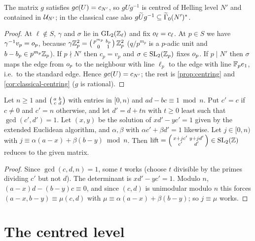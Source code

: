 \begin{proposition}\label{prop:centring-algorithm}
The matrix $g$ satisfies $gc(U) = c_{N'}$, so $gUg^{-1}$ is
centred of Helling level $N'$ and contained in $\mathcal{U}_{N'}$; in the
classical case also $g\lifted{U}g^{-1} \subseteq \GammaZeroStar[lift]{N'}$.
\end{proposition}

\begin{proof}
At $\ell \notin S$, $\gamma$ and $\sigma$ lie in $\GL{2}{\ZZ_\ell}$ and fix
$o_{\ell} = c_\ell$. At $p \in S$ we have
$\gamma^{-1}v_p = o_{p}$, because
$\gamma\mathbb{Z}_{p}^2 = \left(\begin{smallmatrix} p^{m_p} & b_p \\ 0 & 1 \end{smallmatrix}\right)\mathbb{Z}_{p}^2$
($q/p^{m_p}$ is a $p$-adic unit and $b - b_p \in p^{m_p}\mathbb{Z}_{p}$).
If $p \nmid N'$ then $c_p = v_p$ and $\sigma \in \SL{2}{\pAdicIntegers{p}}$
fixes $o_{p}$. If $p \mid N'$ then $\sigma$ maps the edge from
$o_{p}$ to the neighbour with line $\ell_p$ to the edge with
line $\mathbb{F}_{p}e_{1}$, i.e.\ to the standard edge. Hence
$gc(U) = c_{N'}$; the rest is \cref{prop:centring} and
\cref{cor:classical-centring} ($g$ is rational).
\end{proof}

\begin{lemma}\label{lem:sl2-lift}
Let $n \geq 1$ and $\left(\begin{smallmatrix} a & b \\ c & d \end{smallmatrix}\right)$ with entries in $[0, n)$ and
$ad - bc \equiv 1 \bmod n$. Put $c' = c$ if $c \neq 0$ and $c' = n$ otherwise,
and let $d' = d + tn$ with $t \geq 0$ least such that $\gcd(c', d') = 1$. Let
$(x, y)$ be the solution of $xd' - yc' = 1$ given by the extended Euclidean
algorithm, and $\alpha, \beta$ with $\alpha c' + \beta d' = 1$ likewise. Let
$j \in [0, n)$ with $j \equiv \alpha(a - x) + \beta(b - y) \bmod n$. Then
$\mathrm{lift} = \smallMat{x + jc'}{y + jd'}{c'}{d'} \in \SL{2}{\ZZ}$ reduces to
the given matrix.
\end{lemma}

\begin{proof}
Since $\gcd(c, d, n) = 1$, some $t$ works (choose $t$ divisible by the primes
dividing $c'$ but not $d$). The determinant is $xd' - yc' = 1$. Modulo $n$,
$(a - x)d - (b - y)c \equiv 0$, and since $(c, d)$ is unimodular modulo $n$
this forces $(a - x, b - y) \equiv \mu(c, d)$ with
$\mu \equiv \alpha(a-x) + \beta(b-y)$; so $j \equiv \mu$ works.
\end{proof}

\section{The centred level}

